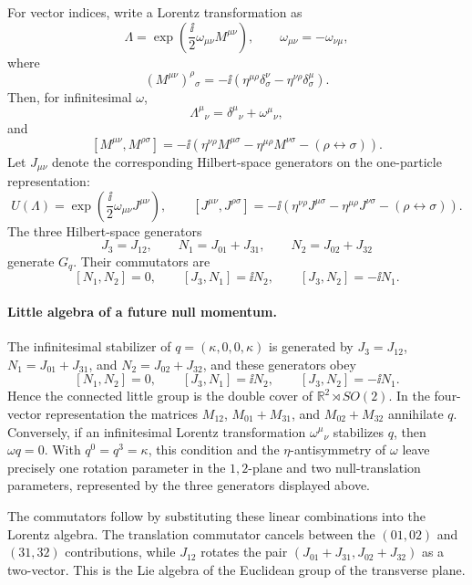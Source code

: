 For vector indices, write a Lorentz transformation as
\[
  \Lambda
  =
  \exp\!\left(\frac{\ii}{2}\omega_{\mu\nu}M^{\mu\nu}\right),
  \qquad
  \omega_{\mu\nu}=-\omega_{\nu\mu},
\]
where
\[
  (M^{\mu\nu})^\rho{}_\sigma
  =
  -\ii\left(
    \eta^{\mu\rho}\delta^\nu_\sigma
    -
    \eta^{\nu\rho}\delta^\mu_\sigma
  \right).
\]
Then, for infinitesimal \(\omega\),
\[
  \Lambda^\mu{}_\nu=\delta^\mu{}_\nu+\omega^\mu{}_\nu,
\]
and
\[
  [M^{\mu\nu},M^{\rho\sigma}]
  =
  -\ii\left(
    \eta^{\nu\rho}M^{\mu\sigma}
    -
    \eta^{\mu\rho}M^{\nu\sigma}
    -(\rho\leftrightarrow\sigma)
  \right).
\]
Let \(J_{\mu\nu}\) denote the corresponding Hilbert-space generators on the
one-particle representation:
\[
  U(\Lambda)
  =
  \exp\!\left(\frac{\ii}{2}\omega_{\mu\nu}J^{\mu\nu}\right),
  \qquad
  [J^{\mu\nu},J^{\rho\sigma}]
  =
  -\ii\left(
    \eta^{\nu\rho}J^{\mu\sigma}
    -
    \eta^{\mu\rho}J^{\nu\sigma}
    -(\rho\leftrightarrow\sigma)
  \right).
\]
The three Hilbert-space generators
\[
  J_3=J_{12},
  \qquad
  N_1=J_{01}+J_{31},
  \qquad
  N_2=J_{02}+J_{32}
\]
generate \(G_q\). Their commutators are
\[
  [N_1,N_2]=0,
  \qquad
  [J_3,N_1]=\ii N_2,
  \qquad
  [J_3,N_2]=-\ii N_1.
\]

\paragraph{Little algebra of a future null momentum.}
  The infinitesimal stabilizer of \(q=(\kappa,0,0,\kappa)\) is generated by
  \(J_3=J_{12}\), \(N_1=J_{01}+J_{31}\), and \(N_2=J_{02}+J_{32}\), and these
  generators obey
  \[
    [N_1,N_2]=0,\qquad
    [J_3,N_1]=\ii N_2,\qquad
    [J_3,N_2]=-\ii N_1 .
  \]
  Hence the connected little group is the double cover of
  \(\mathbb R^2\rtimes SO(2)\).
In the four-vector representation the matrices \(M_{12}\),
\(M_{01}+M_{31}\), and \(M_{02}+M_{32}\) annihilate \(q\).  Conversely, if
an infinitesimal Lorentz transformation \(\omega^\mu{}_\nu\) stabilizes
\(q\), then \(\omega q=0\).  With \(q^0=q^3=\kappa\), this condition and the
\(\eta\)-antisymmetry of \(\omega\) leave precisely one rotation parameter in
the \(1,2\)-plane and two null-translation parameters, represented by the
three generators displayed above.

The commutators follow by substituting these linear combinations into the
Lorentz algebra.  The translation commutator cancels between the
\((01,02)\) and \((31,32)\) contributions, while \(J_{12}\) rotates the pair
\((J_{01}+J_{31},J_{02}+J_{32})\) as a two-vector.  This is the Lie algebra
of the Euclidean group of the transverse plane.

